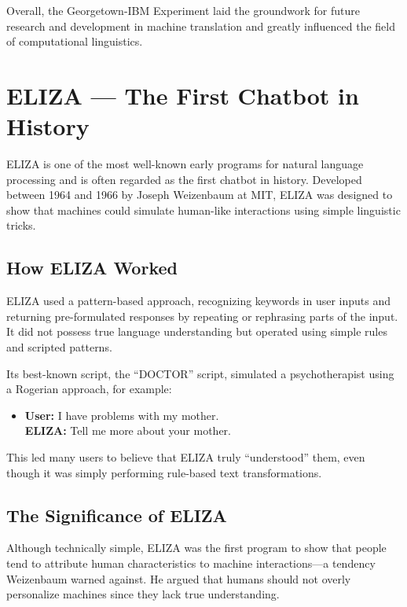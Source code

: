 Overall, the Georgetown-IBM Experiment laid the groundwork for future research and
development in machine translation and greatly influenced the field of computational
linguistics.


\section{ELIZA --- The First Chatbot in History}

ELIZA is one of the most well-known early programs for natural language processing and
is often regarded as the first chatbot in history. Developed between 1964 and 1966 by
Joseph Weizenbaum at MIT, ELIZA was designed to show that machines could simulate
human-like interactions using simple linguistic tricks.

\subsection{How ELIZA Worked}

ELIZA used a pattern-based approach, recognizing keywords in user inputs and returning
pre-formulated responses by repeating or rephrasing parts of the input. It did not
possess true language understanding but operated using simple rules and scripted patterns.

Its best-known script, the “DOCTOR” script, simulated a psychotherapist using a
Rogerian approach, for example:
\begin{itemize}
  \item \textbf{User:} I have problems with my mother.\\
        \textbf{ELIZA:} Tell me more about your mother.
\end{itemize}
This led many users to believe that ELIZA truly “understood” them, even though it was
simply performing rule-based text transformations.

\subsection{The Significance of ELIZA}

Although technically simple, ELIZA was the first program to show that people tend to
attribute human characteristics to machine interactions—a tendency Weizenbaum warned
against. He argued that humans should not overly personalize machines since they lack
true understanding.

